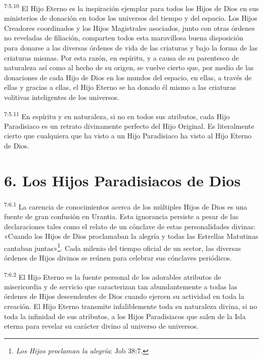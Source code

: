 \par
\textsuperscript{7:5.10} El Hijo Eterno es la inspiración ejemplar para todos los Hijos de Dios en sus ministerios de donación en todos los universos del tiempo y del espacio. Los Hijos Creadores coordinados y los Hijos Magistrales asociados, junto con otras órdenes no reveladas de filiación, comparten todos esta maravillosa buena disposición para donarse a las diversas órdenes de vida de las criaturas y bajo la forma de las criaturas mismas. Por esta razón, en espíritu, y a causa de su parentesco de naturaleza así como al hecho de su origen, se vuelve cierto que, por medio de las donaciones de cada Hijo de Dios en los mundos del espacio, en ellas, a través de ellas y gracias a ellas, el Hijo Eterno se ha donado él mismo a las criaturas volitivas inteligentes de los universos.

\par
\textsuperscript{7:5.11} En espíritu y en naturaleza, si no en todos sus atributos, cada Hijo Paradisiaco es un retrato divinamente perfecto del Hijo Original. Es literalmente cierto que cualquiera que ha visto a un Hijo Paradisiaco ha visto al Hijo Eterno de Dios.

\section*{6. Los Hijos Paradisiacos de Dios}
\par
\textsuperscript{7:6.1} La carencia de conocimientos acerca de los múltiples Hijos de Dios es una fuente de gran confusión en Urantia. Esta ignorancia persiste a pesar de las declaraciones tales como el relato de un cónclave de estas personalidades divinas: «Cuando los Hijos de Dios proclamaban la alegría y todas las Estrellas Matutinas cantaban juntas»\footnote{\textit{Los Hijos proclaman la alegría}: Job 38:7.}. Cada milenio del tiempo oficial de un sector, las diversas órdenes de Hijos divinos se reúnen para celebrar sus cónclaves periódicos.

\par
\textsuperscript{7:6.2} El Hijo Eterno es la fuente personal de los adorables atributos de misericordia y de servicio que caracterizan tan abundantemente a todas las órdenes de Hijos descendentes de Dios cuando ejercen su actividad en toda la creación. El Hijo Eterno transmite infaliblemente toda su naturaleza divina, si no toda la infinidad de sus atributos, a los Hijos Paradisiacos que salen de la Isla eterna para revelar su carácter divino al universo de universos.

